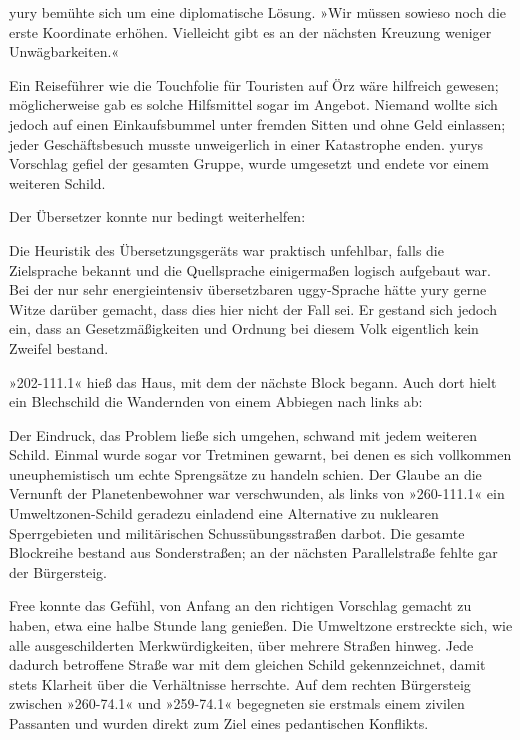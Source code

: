 yury bemühte sich um eine diplomatische Lösung. »Wir müssen sowieso noch die erste Koordinate erhöhen. Vielleicht gibt es an der nächsten Kreuzung weniger Unwägbarkeiten.«

Ein Reiseführer wie die Touchfolie für Touristen auf Örz wäre hilfreich gewesen; möglicherweise gab es solche Hilfsmittel sogar im Angebot. Niemand wollte sich jedoch auf einen Einkaufsbummel unter fremden Sitten und ohne Geld einlassen; jeder Geschäftsbesuch musste unweigerlich in einer Katastrophe enden. yurys Vorschlag gefiel der gesamten Gruppe, wurde umgesetzt und endete vor einem weiteren Schild.

 Der Übersetzer konnte nur bedingt weiterhelfen: 

Die Heuristik des Übersetzungsgeräts war praktisch unfehlbar, falls die Zielsprache bekannt und die Quellsprache einigermaßen logisch aufgebaut war. Bei der nur sehr energieintensiv übersetzbaren uggy-Sprache hätte yury gerne Witze darüber gemacht, dass dies hier nicht der Fall sei. Er gestand sich jedoch ein, dass an Gesetzmäßigkeiten und Ordnung bei diesem Volk eigentlich kein Zweifel bestand.

»202-111.1« hieß das Haus, mit dem der nächste Block begann. Auch dort hielt ein Blechschild die Wandernden von einem Abbiegen nach links ab: 

Der Eindruck, das Problem ließe sich umgehen, schwand mit jedem weiteren Schild. Einmal wurde sogar vor Tretminen gewarnt, bei denen es sich vollkommen uneuphemistisch um echte Sprengsätze zu handeln schien. Der Glaube an die Vernunft der Planetenbewohner war verschwunden, als links von »260-111.1« ein Umweltzonen-Schild geradezu einladend eine Alternative zu nuklearen Sperrgebieten und militärischen Schussübungsstraßen darbot. Die gesamte Blockreihe bestand aus Sonderstraßen; an der nächsten Parallelstraße fehlte gar der Bürgersteig.

Free konnte das Gefühl, von Anfang an den richtigen Vorschlag gemacht zu haben, etwa eine halbe Stunde lang genießen. Die Umweltzone erstreckte sich, wie alle ausgeschilderten Merkwürdigkeiten, über mehrere Straßen hinweg. Jede dadurch betroffene Straße war mit dem gleichen Schild gekennzeichnet, damit stets Klarheit über die Verhältnisse herrschte. Auf dem rechten Bürgersteig zwischen »260-74.1« und »259-74.1« begegneten sie erstmals einem zivilen Passanten und wurden direkt zum Ziel eines pedantischen Konflikts.

